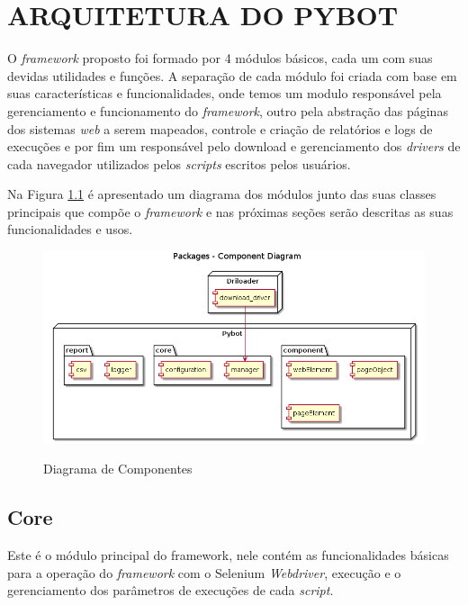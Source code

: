 %
%
\chapter{ARQUITETURA DO PYBOT}\label{chap:imp}
    O \textit{framework} proposto foi formado por 4 módulos básicos, cada um com suas devidas utilidades e funções.
    A separação de cada módulo foi criada com base em suas características e funcionalidades, onde temos um modulo responsável pela gerenciamento e
    funcionamento do \textit{framework}, outro pela abstração das páginas dos sistemas \textit{web} a serem mapeados, controle e criação de relatórios
    e logs de execuções e por fim um responsável pelo download e gerenciamento dos \textit{drivers} de cada navegador utilizados pelos \textit{scripts}
    escritos pelos usuários.

    Na Figura \ref{fig:modules} é apresentado um diagrama dos módulos junto das suas classes principais que compõe o
    \textit{framework} e nas próximas seções serão descritas as suas funcionalidades e usos.


    \begin{figure}[H]
        \vspace*{0,3cm}
        \centering
        \caption{Diagrama de Componentes}
        \includegraphics[width=1\textwidth]{./04-figuras/model}
        \label{fig:modules}
    \end{figure}

    \section{Core}
        Este é o módulo principal do framework, nele contém as funcionalidades básicas para a operação do \textit{framework} com o Selenium \textit{Webdriver},
        execução e o gerenciamento dos parâmetros de execuções de cada \textit{script}.

